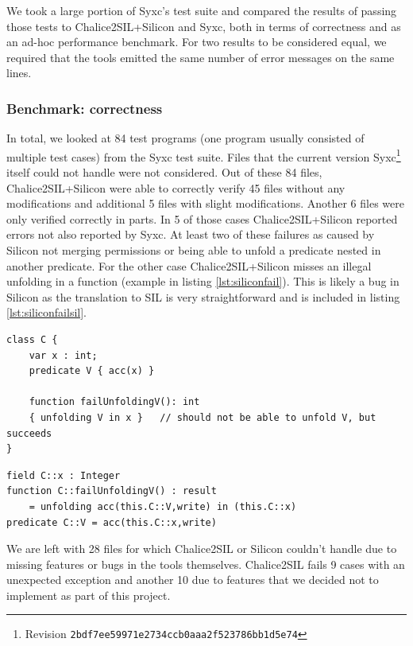 We took a large portion of Syxc's test suite and compared the results of passing those tests to Chalice2SIL+Silicon and Syxc, both in terms of correctness and as an ad-hoc performance benchmark.
For two results to be considered equal, we required that the tools emitted the same number of error messages on the same lines.

\subsubsection{Benchmark: correctness}
In total, we looked at 84 test programs (one program usually consisted of multiple test cases) from the Syxc test suite. 
Files that the current version Syxc\footnote{Revision \texttt{2bdf7ee59971e2734ccb0aaa2f523786bb1d5e74}} itself could not handle were not considered.
Out of these 84 files, Chalice2SIL+Silicon were able to correctly verify 45 files without any modifications and additional 5 files with slight modifications.
Another 6 files were only verified correctly in parts.
In 5 of those cases Chalice2SIL+Silicon reported errors not also reported by Syxc.
At least two of these failures as caused by Silicon not merging permissions or being able to unfold a predicate nested in another predicate.
For the other case Chalice2SIL+Silicon misses an illegal unfolding in a function (example in listing \ref{lst:siliconfail}).
This is likely a bug in Silicon as the translation to SIL is very straightforward and is included in listing \ref{lst:siliconfailsil}.

\begin{lstlisting}[language=Chalice,float,caption={Error that is not detected by Chalice2SIL+Silicon.},label={lst:siliconfail}]
class C {
    var x : int;
    predicate V { acc(x) }

	function failUnfoldingV(): int
	{ unfolding V in x }   // should not be able to unfold V, but succeeds
}
\end{lstlisting}

\begin{lstlisting}[language=SIL,float,caption={SIL translation of \ref{lst:siliconfail}},label={lst:siliconfailsil}]
field C::x : Integer
function C::failUnfoldingV() : result 
	= unfolding acc(this.C::V,write) in (this.C::x)
predicate C::V = acc(this.C::x,write)
\end{lstlisting}

We are left with 28 files for which Chalice2SIL or Silicon couldn't handle due to missing features or bugs in the tools themselves.
Chalice2SIL fails 9 cases with an unexpected exception and another 10 due to features that we decided not to implement as part of this project.

